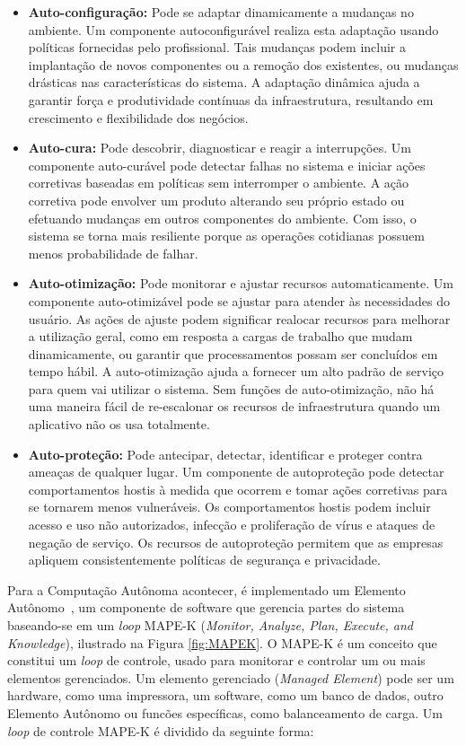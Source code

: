 \documentclass[portugues]{ic-tese}
\begin{document}
\begin{itemize}
\item \textbf{Auto-configuração:} Pode se adaptar dinamicamente a mudanças no ambiente. Um componente autoconfigurável realiza esta adaptação usando políticas fornecidas pelo profissional. Tais mudanças podem incluir a implantação de novos componentes ou a remoção dos existentes, ou mudanças drásticas nas características do sistema. A adaptação dinâmica ajuda a garantir força e produtividade contínuas da infraestrutura, resultando em crescimento e flexibilidade dos negócios.
\item \textbf{Auto-cura:} Pode descobrir, diagnosticar e reagir a interrupções. Um componente auto-curável pode detectar falhas no sistema e iniciar ações corretivas baseadas em políticas sem interromper o ambiente. A ação corretiva pode envolver um produto alterando seu próprio estado ou efetuando mudanças em outros componentes do ambiente. Com isso, o sistema se torna mais resiliente porque as operações cotidianas possuem menos probabilidade de falhar.
\item \textbf{Auto-otimização:} Pode monitorar e ajustar recursos automaticamente. Um componente auto-otimizável pode se ajustar para atender às necessidades do usuário. As ações de ajuste podem significar realocar recursos para melhorar a utilização geral, como em resposta a cargas de trabalho que mudam dinamicamente, ou garantir que processamentos possam ser concluídos em tempo hábil. A auto-otimização ajuda a fornecer um alto padrão de serviço para quem vai utilizar o sistema. Sem funções de auto-otimização, não há uma maneira fácil de re-escalonar os recursos de infraestrutura quando um aplicativo não os usa totalmente.
\item \textbf{Auto-proteção:} Pode antecipar, detectar, identificar e proteger contra ameaças de qualquer lugar. Um componente de autoproteção pode detectar comportamentos hostis à medida que ocorrem e tomar ações corretivas para se tornarem menos vulneráveis. Os comportamentos hostis podem incluir acesso e uso não autorizados, infecção e proliferação de vírus e ataques de negação de serviço. Os recursos de autoproteção permitem que as empresas apliquem consistentemente políticas de segurança e privacidade.
\end{itemize}

Para a Computação Autônoma acontecer, é implementado um Elemento Autônomo~\citep{Abbas_2010}, um componente de software que gerencia partes do sistema baseando-se em um \textit{loop} MAPE-K (\textit{Monitor, Analyze, Plan, Execute, and Knowledge}), ilustrado na Figura \ref{fig:MAPEK}. O MAPE-K é um conceito que constitui um \textit{loop} de controle, usado para monitorar e controlar um ou mais elementos gerenciados. Um elemento gerenciado (\textit{Managed Element}) pode ser um hardware, como uma impressora, um software, como um banco de dados, outro Elemento Autônomo ou funcões específicas, como balanceamento de carga. Um \textit{loop} de controle MAPE-K é dividido da seguinte forma:
\end{document}

